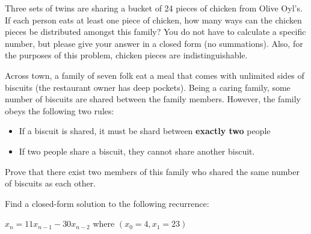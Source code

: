\documentclass[12pt,oneside]{article}
\begin{document}
\newpage

\begin{problem}{10}

\bparts
{}
Three sets of twins are sharing a bucket of 24 pieces of chicken from Olive Oyl's.  If each person eats at least one piece of chicken, how many ways can the chicken pieces be distributed amongst this family?  You do not have to calculate a specific number, but please give your answer in a closed form (no summations).  Also,
for the purposes of this problem, chicken pieces are indistinguishable.

\vspace{3 in}


Across town, a family of seven folk eat a meal that comes with unlimited sides of biscuits (the restaurant owner has deep pockets).  Being a caring family, some number of biscuits are shared between the family members.  However, the family obeys the following two rules:

\begin{itemize}
	\item If a biscuit is shared, it must be shard between \textbf{exactly two} people
	\item If two people share a biscuit, they cannot share another biscuit.  
\end{itemize}

Prove that there exist two members of this family who shared the same number of biscuits as each other.
\vspace{4 in}

\eparts
\end{problem}


\newpage

\begin{problem}{10}

Find a closed-form solution to the following recurrence: 

$x_n = 11x_{n-1} - 30x_{n-2}$ where $(x_0 =4, x_1 = 23)$
\end{problem}

\newpage
\end{document}
